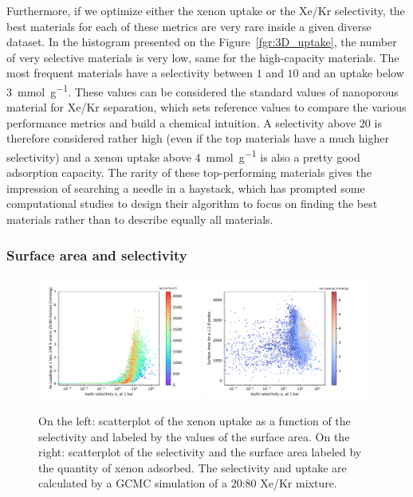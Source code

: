 \documentclass[main.tex]{subfiles}
\begin{document}
Furthermore, if we optimize either the xenon uptake or the Xe/Kr selectivity, the best materials for each of these metrics are very rare inside a given diverse dataset. In the histogram presented on the Figure~\ref{fgr:3D_uptake}, the number of very selective materials is very low, same for the high-capacity materials. The most frequent materials have a selectivity between $1$ and $10$ and an uptake below \SI{3}{\milli\mole\per\gram}. These values can be considered the standard values of nanoporous material for Xe/Kr separation, which sets reference values to compare the various performance metrics and build a chemical intuition. A selectivity above $20$ is therefore considered rather high (even if the top materials have a much higher selectivity\autocite{Pei_2022}) and a xenon uptake above \SI{4}{\milli\mole\per\gram} is also a pretty good adsorption capacity. The rarity of these top-performing materials gives the impression of searching a needle in a haystack, which has prompted some computational studies to design their algorithm to focus on finding the best materials rather than to describe equally all materials.\autocite{Deshwal_2021,Glasby_2021} 

\subsubsection{Surface area and selectivity}

\begin{figure}[ht!]
  \centering
  \includegraphics[width=0.48\textwidth]{figures/2-thermo/Scatterplot_uptake_selectivity_sa.pdf}
  \includegraphics[width=0.48\textwidth]{figures/2-thermo/Scatterplot_sa_selectivity.pdf}
  \caption{On the left: scatterplot of the xenon uptake as a function of the selectivity and labeled by the values of the surface area. On the right: scatterplot of the selectivity and the surface area labeled by the quantity of xenon adsorbed. The selectivity and uptake are calculated by a GCMC simulation of a 20:80 Xe/Kr mixture.}\label{fgr:sa}
\end{figure}
\end{document}
